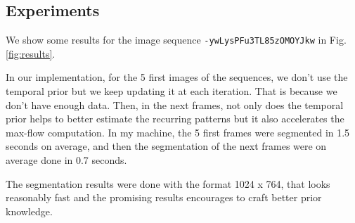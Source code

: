 \documentclass[a4paper,twoside,10pt]{article}
\begin{document}
\subsection{Experiments}

We show some results for the image sequence \texttt{-ywLysPFu3TL85zOMOYJkw} in Fig. \ref{fig:results}.

In our implementation, for the 5 first images of the sequences, we don't use the temporal prior but we keep updating it at each iteration. That is because we don't have enough data. Then, in the next frames, not only does the temporal prior helps to better estimate the recurring patterns but it also accelerates the max-flow computation.
In my machine, the 5 first frames were segmented in 1.5 seconds on average, and then the segmentation of the next frames were on average done in 0.7 seconds.

The segmentation results were done with the format 1024 x 764, that looks reasonably fast and the promising results encourages to craft better prior knowledge.
\end{document}
